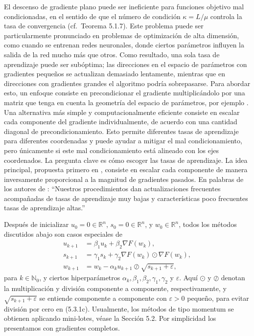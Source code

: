 \documentclass[11pt]{report}
\theoremstyle{definition}
\theoremstyle{plain}
\numberwithin{equation}{section}
\begin{document}
El descenso de gradiente plano puede ser ineficiente para funciones objetivo mal condicionadas, en el sentido de que el número de condición \(\kappa=L/\mu\) controla la tasa de convergencia (cf.\ Teorema 5.1.7). Este problema puede ser particularmente pronunciado en problemas de optimización de alta dimensión, como cuando se entrenan redes neuronales, donde ciertos parámetros influyen la salida de la red mucho más que otros. Como resultado, una sola tasa de aprendizaje puede ser subóptima; las direcciones en el espacio de parámetros con gradientes pequeños se actualizan demasiado lentamente, mientras que en direcciones con gradientes grandes el algoritmo podría sobrepasarse. Para abordar esto, un enfoque consiste en precondicionar el gradiente multiplicándolo por una matriz que tenga en cuenta la geometría del espacio de parámetros, por ejemplo \cite{amari-1998,martens-grosse-2015}. Una alternativa más simple y computacionalmente eficiente consiste en escalar cada componente del gradiente individualmente, de acuerdo con una cantidad diagonal de precondicionamiento. Esto permite diferentes tasas de aprendizaje para diferentes coordenadas y puede ayudar a mitigar el mal condicionamiento, pero únicamente si este mal condicionamiento está alineado con los ejes coordenados. La pregunta clave es cómo escoger las tasas de aprendizaje. La idea principal, propuesta primero en \cite{duchi-hazan-singer-2011}, consiste en escalar cada componente de manera inversamente proporcional a la magnitud de gradientes pasados. En palabras de los autores de \cite{duchi-hazan-singer-2011}: ``Nuestros procedimientos dan actualizaciones frecuentes acompañadas de tasas de aprendizaje muy bajas y características poco frecuentes tasas de aprendizaje altas.''

Después de inicializar \(u_0=0\in\mathbb{R}^n\), \(s_0=0\in\mathbb{R}^n\), y \(w_0\in\mathbb{R}^n\), todos los métodos discutidos abajo son casos especiales de
\begin{align*}
    u_{k+1}
    &=
    \beta_1u_k+\beta_2\nabla F(w_k),
    \tag{5.3.1a}\\
    s_{k+1}
    &=
    \gamma_1s_k+\gamma_2\nabla F(w_k)\odot\nabla F(w_k),
    \tag{5.3.1b}\\
    w_{k+1}
    &=
    w_k-\alpha_k u_{k+1}\oslash\sqrt{s_{k+1}+\varepsilon},
    \tag{5.3.1c}
\end{align*}
para \(k\in\mathbb{N}_0\), y ciertos hiperparámetros \(\alpha_k,\beta_1,\beta_2,\gamma_1,\gamma_2\) y \(\varepsilon\). Aquí \(\odot\) y \(\oslash\) denotan la multiplicación y división componente a componente, respectivamente, y \(\sqrt{s_{k+1}+\varepsilon}\) se entiende componente a componente con \(\varepsilon>0\) pequeño, para evitar división por cero en (5.3.1c). Usualmente, los métodos de tipo momentum se obtienen aplicando mini-lotes, véase la Sección 5.2. Por simplicidad los presentamos con gradientes completos.
\end{document}
